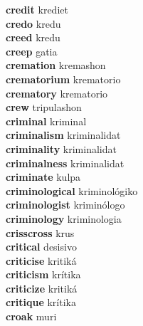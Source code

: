\textbf{credit } krediet \\
\textbf{credo } kredu \\
\textbf{creed } kredu \\
\textbf{creep } gatia \\
\textbf{cremation } kremashon \\
\textbf{crematorium } krematorio \\
\textbf{crematory } krematorio \\
\textbf{crew } tripulashon \\
\textbf{criminal } kriminal \\
\textbf{criminalism } kriminalidat \\
\textbf{criminality } kriminalidat \\
\textbf{criminalness } kriminalidat \\
\textbf{criminate } kulpa \\
\textbf{criminological } kriminológiko \\
\textbf{criminologist } kriminólogo \\
\textbf{criminology } kriminologia \\
\textbf{crisscross } krus \\
\textbf{critical } desisivo \\
\textbf{criticise } kritiká \\
\textbf{criticism } krítika \\
\textbf{criticize } kritiká \\
\textbf{critique } krítika \\
\textbf{croak } muri \\

